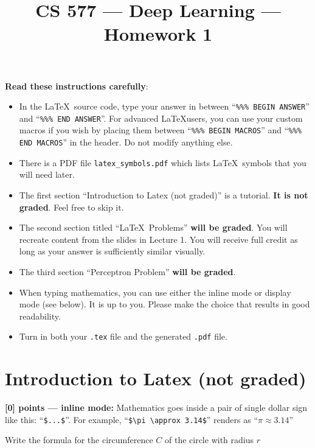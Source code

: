 \documentclass{article}
\title{CS 577 --- Deep Learning --- Homework 1}
\author{}
\date{}
\begin{document}
\maketitle
\textbf{Read these instructions carefully}:
\begin{itemize}
  \item
In the \LaTeX~source code, type your answer in between
``\verb|%%% BEGIN ANSWER|'' and
``\verb|%%% END ANSWER|''.
        For advanced \LaTeX users,
        you can use your custom macros if you wish
        by placing them
        between
``\verb|%%% BEGIN MACROS|'' and
``\verb|%%% END MACROS|'' in the header.
        Do not modify anything else.


  \item
There is a PDF file \verb|latex_symbols.pdf| which lists \LaTeX~symbols that you will need later.


  \item
The first section ``Introduction to Latex (not graded)'' is a tutorial. \textbf{It is not graded}. Feel free to skip it.

  \item The second section titled ``\LaTeX~Problems'' \textbf{will be graded}. You will recreate content from the slides in Lecture 1. You will receive full credit as long as your answer is sufficiently similar visually.

  \item The third section ``Perceptron Problem'' \textbf{will be graded}.

  \item When typing mathematics, you can use either the inline mode or display mode (see below). It is up to you. Please make the choice that results in good readability.

  \item Turn in both your \verb|.tex| file and the generated \verb|.pdf| file.
\end{itemize}



\section{Introduction to Latex (not graded)}


\textbf{[0] points --- inline mode:}
Mathematics goes inside a pair of single dollar sign like this: ``\verb|$...$|''.
For example,
``\verb|$\pi \approx 3.14$|'' renders as
``$\pi \approx 3.14$''

 Write the formula for the circumference $C$ of the circle with radius $r$
\end{document}
